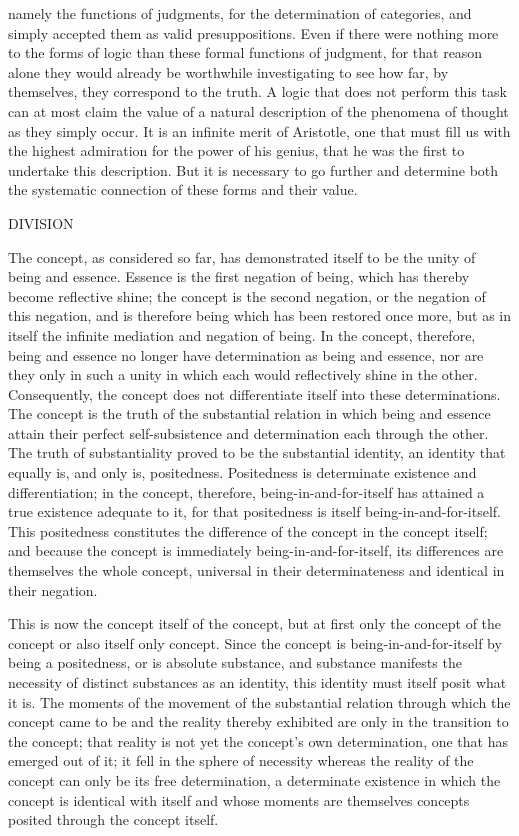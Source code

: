 namely the functions of judgments,
for the determination of categories,
and simply accepted them as valid presuppositions.
Even if there were nothing more to the forms of logic
than these formal functions of judgment,
for that reason alone they would already be
worthwhile investigating to see how far,
by themselves, they correspond to the truth.
A logic that does not perform this task
can at most claim the value of 
a natural description of the phenomena of thought
as they simply occur.
It is an infinite merit of Aristotle,
one that must fill us with the highest admiration
for the power of his genius,
that he was the first to undertake this description.
But it is necessary to go further
and determine both the systematic connection
of these forms and their value.

DIVISION

The concept, as considered so far,
has demonstrated itself to be
the unity of being and essence.
Essence is the first negation of being,
which has thereby become reflective shine;
the concept is the second negation,
or the negation of this negation,
and is therefore being
which has been restored once more,
but as in itself the infinite mediation
and negation of being.
In the concept, therefore,
being and essence no longer have
determination as being and essence,
nor are they only in such a unity
in which each would reflectively shine in the other.
Consequently, the concept does not differentiate
itself into these determinations.
The concept is the truth of the substantial relation
in which being and essence attain their perfect
self-subsistence and determination each through the other.
The truth of substantiality proved
to be the substantial identity,
an identity that equally is,
and only is, positedness.
Positedness is determinate existence and differentiation;
in the concept, therefore, being-in-and-for-itself
has attained a true existence adequate to it,
for that positedness is itself being-in-and-for-itself.
This positedness constitutes the difference
of the concept in the concept itself;
and because the concept is
immediately being-in-and-for-itself,
its differences are themselves the whole concept,
universal in their determinateness
and identical in their negation.

This is now the concept itself of the concept,
but at first only the concept of the concept
or also itself only concept.
Since the concept is being-in-and-for-itself
by being a positedness, or is absolute substance,
and substance manifests the necessity of
distinct substances as an identity,
this identity must itself posit what it is.
The moments of the movement of the substantial relation
through which the concept came to be
and the reality thereby exhibited are
only in the transition to the concept;
that reality is not yet the
concept's own determination,
one that has emerged out of it;
it fell in the sphere of necessity
whereas the reality of the concept
can only be its free determination,
a determinate existence in which
the concept is identical with itself
and whose moments are themselves concepts
posited through the concept itself.

